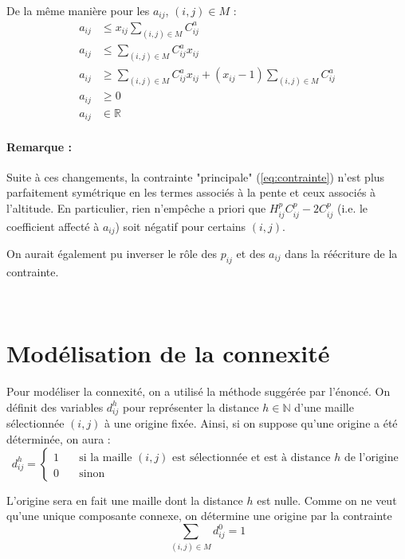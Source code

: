 \documentclass[a4paper,11pt]{article}
\begin{document}
De la même manière pour les $a_{ij}$, $(i,j) \in M$ :
\begin{align}
a_{ij} & \le x_{ij} \sum_{(i,j)\in M} C^a_{ij} \\
a_{ij} & \le \sum_{(i,j)\in M} C^a_{ij} x_{ij} \\
a_{ij} & \ge \sum_{(i,j)\in M} C^a_{ij} x_{ij} + (x_{ij}-1) \sum_{(i,j)\in M} C^a_{ij} \\
a_{ij} & \ge 0 \\
a_{ij} & \in \mathbb{R}
\end{align}


\paragraph{Remarque :} Suite à ces changements, la contrainte "principale" (\ref{eq:contrainte}) n'est plus parfaitement symétrique en les termes associés à la pente et ceux associés à l'altitude. En particulier, rien n'empêche a priori que $H^p_{ij} C^p_{ij} - 2 C^p_{ij}$ (i.e. le coefficient affecté à $a_{ij}$) soit négatif pour certains $(i,j)$.

On aurait également pu inverser le rôle des $p_{ij}$ et des $a_{ij}$ dans la réécriture de la contrainte.












~\\
\newpage
\section{Modélisation de la connexité}

Pour modéliser la connexité, on a utilisé la méthode suggérée par l'énoncé. On définit des variables $d^h_{ij}$ pour représenter la distance $h \in \mathbb{N}$ d'une maille sélectionnée $(i,j)$ à une origine fixée. Ainsi, si on suppose qu'une origine a été déterminée, on aura :
\begin{equation*}
d^h_{ij} = \left\{
\begin{array}{cl}
1 & \quad \text{si la maille } (i,j) \text{ est sélectionnée et est à distance $h$ de l'origine} \\ 
0 & \quad \text{sinon}
\end{array} \right.
\end{equation*}


L'origine sera en fait une maille dont la distance $h$ est nulle. Comme on ne veut qu'une unique composante connexe, on détermine une origine par la contrainte 
\begin{equation}
\sum_{(i,j)\in M} d^0_{ij} = 1
\end{equation}
\end{document}
